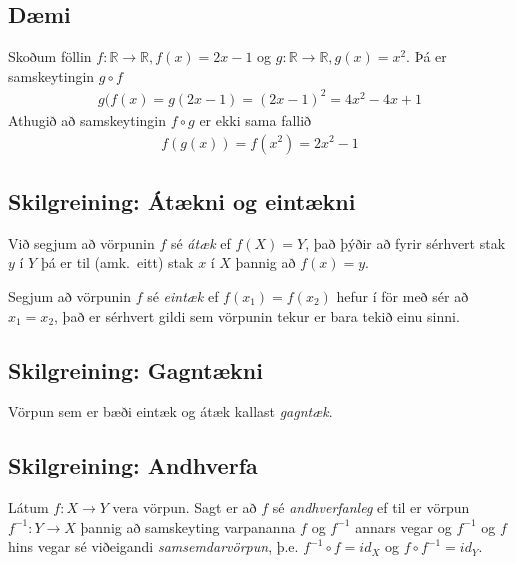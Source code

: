 \documentclass[b5paper,11pt,icelandic]{sphinxmanual}
\begin{document}


\subsection{Dæmi}
\label{kafli01:daemi}
Skoðum föllin \(f:\mathbb R \to \mathbb R, f(x) = 2x-1\)
og \(g:\mathbb R \to \mathbb R, g(x) = x^2\).
Þá er samskeytingin \(g\circ f\)
\begin{equation*}
\begin{split}g(f(x) = g(2x -1) = (2x-1)^2 = 4x^2-4x+1\end{split}
\end{equation*}
Athugið að samskeytingin \(f \circ g\) er ekki sama fallið
\begin{equation*}
\begin{split}f(g(x)) = f(x^2) = 2x^2-1\end{split}
\end{equation*}

\subsection{Skilgreining: Átækni og eintækni}
\label{kafli01:skilgreining-ataekni-og-eintaekni}\label{kafli01:index-6}
Við segjum að vörpunin \(f\) sé \textit{átæk} ef
\(f(X)=Y\), það þýðir að fyrir sérhvert stak \(y\) í \(Y\)
þá er til (amk. eitt) stak \(x\) í \(X\) þannig að
\(f(x)=y\).

Segjum að vörpunin \(f\) sé \textit{eintæk} ef \(f(x_1) = f(x_2)\)
hefur í för með sér að \(x_1=x_2\), það er sérhvert gildi sem vörpunin
tekur er bara tekið einu sinni.


\subsection{Skilgreining: Gagntækni}
\label{kafli01:skilgreining-gagntaekni}\label{kafli01:index-7}
Vörpun sem er bæði eintæk og átæk kallast \textit{gagntæk}.


\subsection{Skilgreining: Andhverfa}
\label{kafli01:skilgreining-andhverfa}\label{kafli01:index-8}\label{kafli01:andhverfa}
Látum \(f:X \to Y\) vera vörpun. Sagt er að \(f\)
sé \textit{andhverfanleg} ef til er vörpun \(f^{-1}:Y \to X\) þannig að
samskeyting varpananna \(f\) og \(f^{-1}\) annars vegar og
\(f^{-1}\) og \(f\) hins vegar sé viðeigandi \textit{samsemdarvörpun},
þ.e. \(f^{-1}\circ f=id_X\) og \(f\circ f^{-1} = id_Y\).
\end{document}
